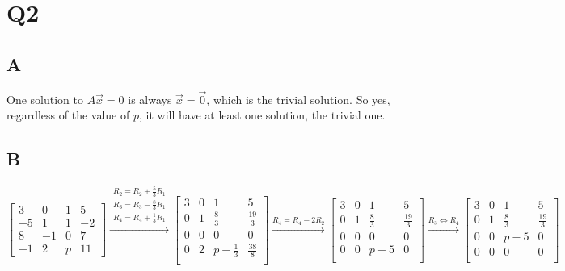 \documentclass{report}
\begin{document}
\section*{Q2}

\subsection*{A}

One solution to $A\vec{x} =0$ is always $\vec{x} = \vec{0}$, which is the trivial solution. So yes, regardless of the value of $p$, it will have at least one solution, the trivial one.

\subsection*{B}

\[
	\begin{bmatrix}
		3  & 0  & 1 & 5  \\
		-5 & 1  & 1 & -2 \\
		8  & -1 & 0 & 7  \\
		-1 & 2  & p & 11
	\end{bmatrix}
	\xrightarrow{
		\begin{aligned}
			R_2 = R_2  + \frac{5}{3}R_1 \\
			R_3 = R_3 - \frac{8}{3}R_1  \\
			R_4 = R_4 + \frac{1}{3}R_1
		\end{aligned}
	}
	\begin{bmatrix}
		3 & 0 & 1             & 5            \\
		0 & 1 & \frac{8}{3}   & \frac{19}{3} \\
		0 & 0 & 0             & 0            \\
		0 & 2 & p+\frac{1}{3} & \frac{38}{8} \\
	\end{bmatrix}
	\xrightarrow{R_4 = R_4 - 2R_2}
	\begin{bmatrix}
		3 & 0 & 1           & 5            \\
		0 & 1 & \frac{8}{3} & \frac{19}{3} \\
		0 & 0 & 0           & 0            \\
		0 & 0 & p-5         & 0            \\
	\end{bmatrix}
	\xrightarrow{R_3 \Leftrightarrow R_4}
	\begin{bmatrix}
		3 & 0 & 1           & 5            \\
		0 & 1 & \frac{8}{3} & \frac{19}{3} \\
		0 & 0 & p-5         & 0            \\
		0 & 0 & 0           & 0            \\
	\end{bmatrix}
\]
\end{document}
